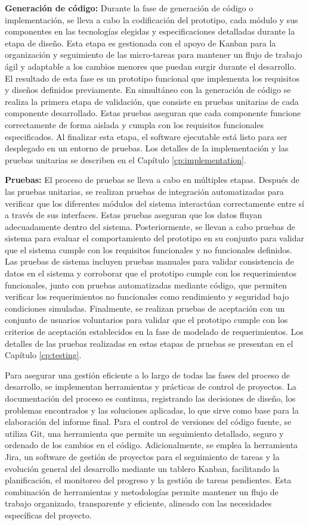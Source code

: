 \textbf{Generación de código:}
Durante la fase de generación de código o implementación, se lleva a cabo la codificación del prototipo, cada módulo y sus componentes en las tecnologías elegidas y especificaciones detalladas durante la etapa de diseño.
Esta etapa es gestionada con el apoyo de Kanban para la organización y seguimiento de las micro-tareas para mantener un flujo de trabajo ágil y adaptable a los cambios menores que puedan surgir durante el desarrollo.
El resultado de esta fase es un prototipo funcional que implementa los requisitos y diseños definidos previamente.
En simultáneo con la generación de código se realiza la primera etapa de validación, que consiste en pruebas unitarias de cada componente desarrollado.
Estas pruebas aseguran que cada componente funcione correctamente de forma aislada y cumpla con los requisitos funcionales especificados.
Al finalizar esta etapa, el software ejecutable está listo para ser desplegado en un entorno de pruebas.
Los detalles de la implementación y las pruebas unitarias se describen en el Capítulo \ref{cp:implementation}.

\textbf{Pruebas:}
El proceso de pruebas se lleva a cabo en múltiples etapas.
Después de las pruebas unitarias, se realizan pruebas de integración automatizadas para verificar que los diferentes módulos del sistema interactúan correctamente entre sí a través de sus interfaces.
Estas pruebas aseguran que los datos fluyan adecuadamente dentro del sistema.
Posteriormente, se llevan a cabo pruebas de sistema para evaluar el comportamiento del prototipo en su conjunto para validar que el sistema cumple con los requisitos funcionales y no funcionales definidos.
Las pruebas de sistema incluyen pruebas manuales para validar consistencia de datos en el sistema y corroborar que el prototipo cumple con los requerimientos funcionales, junto con pruebas automatizadas mediante código, que permiten verificar los requerimientos no funcionales como rendimiento y seguridad bajo condiciones simuladas.
Finalmente, se realizan pruebas de aceptación con un conjunto de usuarios voluntarios para validar que el prototipo cumple con los criterios de aceptación establecidos en la fase de modelado de requerimientos.
Los detalles de las pruebas realizadas en estas etapas de pruebas se presentan en el Capítulo \ref{cp:testing}.

Para asegurar una gestión eficiente a lo largo de todas las fases del proceso de desarrollo, se implementan herramientas y prácticas de control de proyectos. La documentación del proceso es continua, registrando las decisiones de diseño, los problemas encontrados y las soluciones aplicadas, lo que sirve como base para la elaboración del informe final. Para el control de versiones del código fuente, se utiliza Git, una herramienta que permite un seguimiento detallado, seguro y ordenado de los cambios en el código. Adicionalmente, se emplea la herramienta Jira, un software de gestión de proyectos para el seguimiento de tareas y la evolución general del desarrollo mediante un tablero Kanban, facilitando la planificación, el monitoreo del progreso y la gestión de tareas pendientes. Esta combinación de herramientas y metodologías permite mantener un flujo de trabajo organizado, transparente y eficiente, alineado con las necesidades específicas del proyecto.

